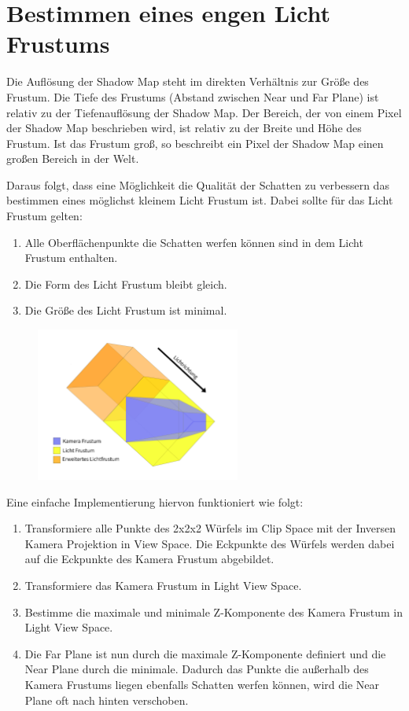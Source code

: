 \section{Bestimmen eines engen Licht Frustums}
\label{section:fit-the-frustum}
Die Auflösung der Shadow Map steht im direkten Verhältnis zur Größe des Frustum.
Die Tiefe des Frustums (Abstand zwischen Near und Far Plane) ist relativ zu der Tiefenauflösung der Shadow Map.
Der Bereich, der von einem Pixel der Shadow Map beschrieben wird, ist relativ zu der Breite und Höhe des Frustum.
Ist das Frustum groß, so beschreibt ein Pixel der Shadow Map einen großen Bereich in der Welt.
\par
Daraus folgt, dass eine Möglichkeit die Qualität der Schatten zu verbessern das bestimmen eines möglichst kleinem
Licht Frustum ist. Dabei sollte für das Licht Frustum gelten:
\begin{enumerate}
  \item Alle Oberflächenpunkte die Schatten werfen können sind in dem Licht Frustum enthalten.
  \item Die Form des Licht Frustum bleibt gleich.
  \item Die Größe des Licht Frustum ist minimal.
\end{enumerate}
\begin{figure}[H]
	\begin{center}
    \includegraphics[width=0.6\textwidth]{res/img/fit-the-frustum.jpg}
    \caption{}
	  \label{fig:fit-the-frustum}
	\end{center}
\end{figure}
Eine einfache Implementierung hiervon funktioniert wie folgt:
\begin{enumerate}
  \item Transformiere alle Punkte des 2x2x2 Würfels im Clip Space mit der Inversen Kamera Projektion
    in View Space. Die Eckpunkte des Würfels werden dabei auf die Eckpunkte des Kamera Frustum abgebildet.
  \item Transformiere das Kamera Frustum in Light View Space.
  \item Bestimme die maximale und minimale Z-Komponente des Kamera Frustum in Light View Space.
  \item Die Far Plane ist nun durch die maximale Z-Komponente definiert und die Near 
    Plane durch die minimale. Dadurch das Punkte die außerhalb des Kamera Frustums liegen ebenfalls Schatten werfen können,
    wird die Near Plane oft nach hinten verschoben.
\end{enumerate}
